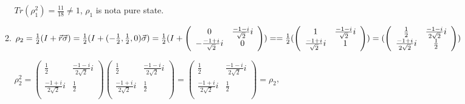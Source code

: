 \documentclass{article}
\begin{document}
\begin{enumerate}
\begin{enumerate}
                    $Tr(\rho_1^2)=\frac{11}{18}\neq1$,
                    $\rho_1$ is nota pure state.
              \item $\rho_2
                        \\=\frac{1}{2}(I+\vec{r}\vec{\sigma})
                        \\=\frac{1}{2}(I+(-\frac{1}{2},\frac{1}{2},0)\vec{\sigma})
                        \\=\frac{1}{2}(I+\left(
                        \begin{array}{cc}
                                0 & \frac{-1-i}{\sqrt{2}}i \\-\frac{-1+i}{\sqrt{2}}i&0\\
                            \end{array}
                        \right))
                        \\==\frac{1}{2}(\left(
                        \begin{array}{cc}
                                1 & \frac{-1-i}{\sqrt{2}}i \\\frac{-1+i}{\sqrt{2}}i&1\\
                            \end{array}
                        \right))
                        \\=(\left(
                        \begin{array}{cc}
                                \frac{1}{2} & \frac{-1-i}{2\sqrt{2}}i \\\frac{-1+i}{2\sqrt{2}}i&\frac{1}{2}\\
                            \end{array}
                        \right))
                    $



                    $\rho_2^2=\left(
                        \begin{array}{cc}
                                \frac{1}{2} & \frac{-1-i}{2\sqrt{2}}i \\\frac{-1+i}{2\sqrt{2}}i&\frac{1}{2}\\
                            \end{array}
                        \right)\left(
                        \begin{array}{cc}
                                \frac{1}{2} & \frac{-1-i}{2\sqrt{2}}i \\\frac{-1+i}{2\sqrt{2}}i&\frac{1}{2}\\
                            \end{array}
                        \right)=\left(
                        \begin{array}{cc}
                                \frac{1}{2} & \frac{-1-i}{2\sqrt{2}}i \\\frac{-1+i}{2\sqrt{2}}i&\frac{1}{2}\\
                            \end{array}
                        \right)
                        =\rho_2
                    $,


\end{enumerate}
\end{enumerate}
\end{document}
